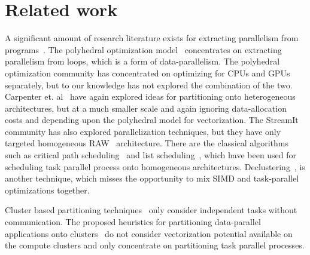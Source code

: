 \section{Related work}
\label{sec:related-work}

A significant amount of research literature exists for extracting
parallelism from programs~\cite{mgri98,jdon06,mgor06,gsih93,pcar09}. The
polyhedral optimization model~\cite{mgri98} concentrates on extracting
parallelism from loops, which is a form of data-parallelism. The
polyhedral optimization community has concentrated on optimizing for
CPUs and GPUs separately, but to our knowledge has not explored the
combination of the two. Carpenter et. al~\cite{pcar09} have again
explored ideas for partitioning onto heterogeneous architectures, but at
a much smaller scale and again ignoring data-allocation costs and
depending upon the polyhedral model for vectorization. The
StreamIt~\cite{wthi02} community has also explored parallelization
techniques, but they have only targeted homogeneous RAW~\cite{ewai97}
architecture. There are the classical algorithms such as critical path
scheduling~\cite{Kohler1975} and list scheduling~\cite{atho74}, which
have been used for scheduling task parallel process onto homogeneous
architectures. Declustering~\cite{gsih93}, is another technique, which
misses the opportunity to mix SIMD and task-parallel optimizations
together.

Cluster based partitioning techniques~\cite{mmah99,adou04,tbra01} only
consider independent tasks without communication. The proposed
heuristics for partitioning data-parallel applications onto
clusters~\cite{ssan05,skum02} do not consider vectorization potential
available on the compute clusters and only concentrate on partitioning
task parallel processes.




